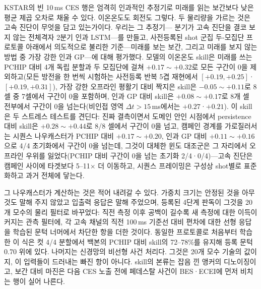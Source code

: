 \documentclass[10pt,a4paper]{article}
\begin{document}
KSTAR의 빈 10\,ms CES 행은 엄격히 인과적인 추정기로 미래를 읽는 보간보다 낮은 평균
제곱 오차로 채울 수 있다. 이온온도도 회전도 그렇다. 두 물리량을 가르는 것은 고속
진단이 무엇을 담고 있는가이다. 우리는 그 추정기---\Vrot{} 분기가 고속 진단을
결코 보지 않는 전체격자 2분기 인과 LSTM---를 만들고, 사전등록된 shot 군집 두-모집단
프로토콜 아래에서 의도적으로 불리한 기준---미래를 보는 보간, 그리고 미래를 보지 않는
방법 중 가장 강한 인과 GP---에 대해 평가했다. 모델의 이온온도 skill은 미래를 쓰는
PCHIP 대비 4개 독립 분할과 두 모집단에 걸쳐 $+0.17\sim+0.32$로 모든 구간이 0을
제외하고(모든 방전을 한 번씩 시험하는 사전등록 반복 5겹 재현에서 $[+0.19, +0.25]$·$[+0.19,
+0.31]$), 가장 강한 오프라인 평활기 대비 짝지은 skill은 $-0.05\sim+0.11$로 8셀 중
7셀에서 구간이 0을 포함하며, 인과 GP 대비 skill은 $+0.08\sim+0.17$로 8개 셀 전부에서
구간이 0을 넘는다(비인접 영역 $\Delta t > 15$\,ms에서는 $+0.27$·$+0.21$). 이 skill은
두 스트레스 테스트를 견딘다: 진짜 결측이면서 도메인 안인 시점에서 persistence 대비
skill은 $+0.28\sim+0.44$로 8/8 셀에서 구간이 0을 넘고, 캠페인 경계를 가로질러서는
시퀀스 나우캐스터가 PCHIP 대비 $+0.17\sim+0.20$, 인과 GP 대비 $+0.11\sim+0.16$으로 4/4
초기화에서 구간이 0을 넘는데, 그것이 대체한 윈도 대조군은 그 자리에서 오프라인
우위를 잃었다(PCHIP 대비 구간이 0을 넘는 초기화 2/4·0/4)---고속 진단은 캠페인 사이에
타겟보다 5--11$\times$ 더 이동하고, 시퀀스 프레이밍은 구성상 shot별로 표준화하고 과거
전체에 닿는다.

그 나우캐스터가 계산하는 것은 적어 내려갈 수 있다. 가중치 크기는 안정된 것을 아무것도
말해 주지 않았고 입출력 응답은 말해 주었으며, 등록된 4단계 판독이 그것을 20개 모수의
물리 필터로 바꾸었다: 직전 측정 이후 공백이 길수록 새 측정에 대한 이득이 커지는 관측
필터에, 각 고속 채널의 직전 100\,ms 기준선 대비 편차에 대한 선형 응답을 학습된 문턱
너머에서 차단한 항을 더한 것이다. 동일한 프로토콜로 처음부터 학습한 이 식은 컷 4/4
분할에서 백본의 PCHIP 대비 skill의 72--78\%를 유지해 등록 문턱 0.70 위에 있다. 나머지는
신경망의 비선형 사건 처리다. 그것은 20개 모수 기술의 값이지, 이 입력들이 드러내는 빠진
항이 아니다. skill의 본류는 잡음 낀 앵커의 디노이징이고, 보간 대비 마진은 다음 CES 노출
전에 페데스탈 사건이 BES·ECEI에 먼저 비치는 행이 실어 나른다.
\end{document}
